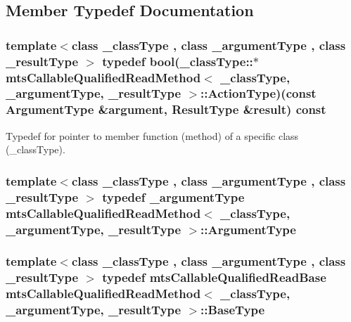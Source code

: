 \subsection{Member Typedef Documentation}
\hypertarget{classmts_callable_qualified_read_method_ac6fc895837df0b66d84405f3ee01f153}{
\subsubsection[{Action\-Type}]{\setlength{\rightskip}{0pt plus 5cm}template$<$class \-\_\-class\-Type , class \-\_\-argument\-Type , class \-\_\-result\-Type $>$ typedef bool(\-\_\-class\-Type\-::$\ast$ {\bf mts\-Callable\-Qualified\-Read\-Method}$<$ \-\_\-class\-Type, \-\_\-argument\-Type, \-\_\-result\-Type $>$\-::Action\-Type)(const {\bf Argument\-Type} \&argument, {\bf Result\-Type} \&result) const }}\label{classmts_callable_qualified_read_method_ac6fc895837df0b66d84405f3ee01f153}
Typedef for pointer to member function (method) of a specific class (\-\_\-class\-Type). \hypertarget{classmts_callable_qualified_read_method_af34f9b3cadebbfecbd679e98c1db0e88}{
\subsubsection[{Argument\-Type}]{\setlength{\rightskip}{0pt plus 5cm}template$<$class \-\_\-class\-Type , class \-\_\-argument\-Type , class \-\_\-result\-Type $>$ typedef \-\_\-argument\-Type {\bf mts\-Callable\-Qualified\-Read\-Method}$<$ \-\_\-class\-Type, \-\_\-argument\-Type, \-\_\-result\-Type $>$\-::{\bf Argument\-Type}}}\label{classmts_callable_qualified_read_method_af34f9b3cadebbfecbd679e98c1db0e88}
\hypertarget{classmts_callable_qualified_read_method_a67c32118a2cca1e3ed70a730e6d53045}{
\subsubsection[{Base\-Type}]{\setlength{\rightskip}{0pt plus 5cm}template$<$class \-\_\-class\-Type , class \-\_\-argument\-Type , class \-\_\-result\-Type $>$ typedef {\bf mts\-Callable\-Qualified\-Read\-Base} {\bf mts\-Callable\-Qualified\-Read\-Method}$<$ \-\_\-class\-Type, \-\_\-argument\-Type, \-\_\-result\-Type $>$\-::{\bf Base\-Type}}}\label{classmts_callable_qualified_read_method_a67c32118a2cca1e3ed70a730e6d53045}
